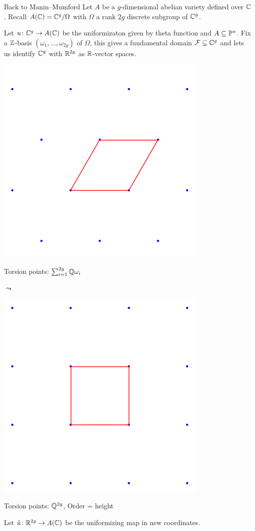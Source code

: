 \documentclass{beamer}
\begin{document}
\begin{frame}{Back to Manin--Mumford}
  Let $A$ be a $g$-dimensional abelian variety defined over ${\mathbb{C}}$.
  Recall
  $A({\mathbb{C}}) = {\mathbb{C}}^g / \Omega$ with $\Omega$ a rank $2g$ discrete
  subgroup of ${\mathbb{C}}^g$. 

  Let $u\colon {\mathbb{C}}^g \rightarrow A({\mathbb{C}})$ be the uniformizaton given by
  theta function and $A\subseteq{\mathbb{P}}^n$. Fix a ${\mathbb{Z}}$-basis
  $(\omega_1,\ldots,\omega_{2g})$ of $\Omega$,
  this gives a fundamental domain ${\mathcal F}\subseteq{\mathbb{C}}^g$ and lets us
  identify ${\mathbb{C}}^g$ with ${\mathbb{R}}^{2g}$ as ${\mathbb{R}}$-vector spaces. 


  \begin{center}
    \begin{minipage}{0.45\linewidth}
      \begin{center}
        \includegraphics[width=.5\textwidth]{fundamentaldomainav.png}

        Torsion points: $\sum_{i=1}^{2g} {\mathbb{Q}}\omega_i$
      \end{center}    
    \end{minipage}$\leadsto$    \begin{minipage}{0.45\linewidth}
      \begin{center}
        \includegraphics[width=.5\textwidth]{fundamentaldomainav2.png}
        
        Torsion points: ${\mathbb{Q}}^{2g}$, Order = height
      \end{center}
    \end{minipage}
  \end{center}

  Let $\tilde u \colon {\mathbb{R}}^{2g}\rightarrow A({\mathbb{C}})$ be the uniformizing map
  in new coordinates. 
\end{frame}
\end{document}
